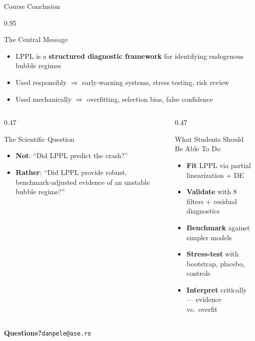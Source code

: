 \documentclass[9pt, aspectratio=169, t]{beamer}
\begin{document}
\begin{frame}{Course Conclusion}
    \begin{cminipage}{0.95\textwidth}
    {\scriptsize
    \begin{block}{The Central Message}
        \begin{itemize}\setlength{\itemsep}{0pt}
            \item LPPL is a \textbf{structured diagnostic framework} for identifying endogenous bubble regimes
            \item Used responsibly $\Rightarrow$ early-warning systems, stress testing, risk review
            \item Used mechanically $\Rightarrow$ overfitting, selection bias, false confidence
        \end{itemize}
    \end{block}
    \vspace{-3mm}
    \begin{columns}[T]
        \begin{column}{0.47\textwidth}
            \begin{block}{The Scientific Question}
                \begin{itemize}\setlength{\itemsep}{0pt}
                    \item \textbf{Not}: ``Did LPPL predict the crash?''
                    \item \textbf{Rather}: ``Did LPPL provide robust, benchmark-adjusted evidence of an unstable bubble regime?''
                \end{itemize}
            \end{block}
        \end{column}
        \begin{column}{0.47\textwidth}
            \begin{exampleblock}{What Students Should Be Able To Do}
                \begin{itemize}\setlength{\itemsep}{0pt}
                    \item \textbf{Fit} LPPL via partial linearization + DE
                    \item \textbf{Validate} with 8 filters + residual diagnostics
                    \item \textbf{Benchmark} against simpler models
                    \item \textbf{Stress-test} with bootstrap, placebo, controls
                    \item \textbf{Interpret} critically --- evidence vs.\ overfit
                \end{itemize}
            \end{exampleblock}
        \end{column}
    \end{columns}
    \vspace{-1mm}
    \begin{center}
        {\Large\textbf{Questions?}}\quad\texttt{danpele@ase.ro}
    \end{center}
    }
    \end{cminipage}
\end{frame}
\end{document}

